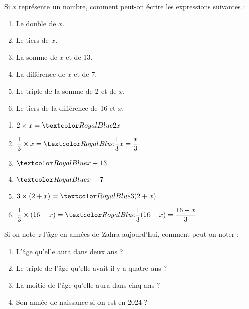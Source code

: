 \begin{Maquette}[Fiche,CorrigeFin,Colonnes=2]{}

   \begin{multicols}{2}

      \begin{exercice} %
         Si $x$ représente un nombre, comment peut-on écrire les expressions suivantes :
         \begin{enumerate}
            \item Le double de $x$.
            \item Le tiers de $x$.
            \item La somme de $x$ et de 13.
            \item La différence de $x$ et de 7.
            \item Le triple de la somme de 2 et de $x$.
            \item Le tiers de la différence de 16 et $x$.
         \end{enumerate}
      \end{exercice}
         
      \begin{Solution}
         \begin{enumerate}
            \item $2\times x =\cor{2x}$ \smallskip
            \item $\dfrac13\times x =\cor{\dfrac13x =\dfrac{x}{3}}$ \smallskip
            \item $\cor{x+13}$
            \item $\cor{x-7}$
            \item $3\times(2+x) =\cor{3(2+x)}$ \smallskip
            \item $\dfrac13\times(16-x) =\cor{\dfrac13(16-x) =\dfrac{16-x}{3}}$
         \end{enumerate}
      \end{Solution}
      

      \begin{exercice} %
         Si on note $z$ l'âge en années de Zahra aujourd’hui, comment peut-on noter :
         \begin{enumerate}
            \item L'âge qu'elle aura dans deux ans ?
            \item Le triple de l'âge qu'elle avait il y a quatre ans ?
            \item La moitié de l'âge qu'elle aura dans cinq ans ?
            \item Son année de naissance si on est en 2024 ?
         \end{enumerate}
      \end{exercice}
      

\end{multicols}
\end{Maquette}
